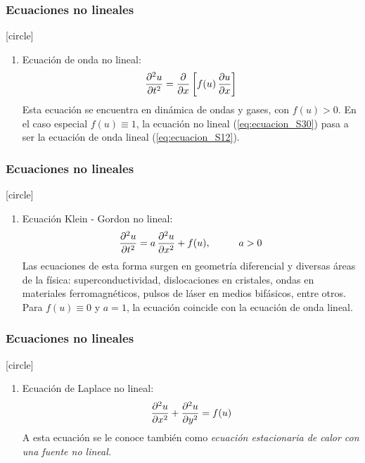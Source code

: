 \documentclass[12pt]{beamer}
\begin{document}
\begin{frame}
\frametitle{Ecuaciones no lineales}
[circle]
\begin{enumerate}[<+->]
\conti
\item Ecuación de onda no lineal:
\pause
\begin{align}
\pdv[2]{u}{t} = \pdv{x} \left[ f(u) \, \pdv{u}{x} \right]
\label{eq:ecuacion_S30}
\end{align}
Esta ecuación se encuentra en dinámica de ondas y gases, con $f(u) > 0$. En el caso especial $f(u) \equiv 1$, la ecuación no lineal (\ref{eq:ecuacion_S30}) pasa a ser la ecuación de onda lineal (\ref{eq:ecuacion_S12}).
\seti
\end{enumerate}
\end{frame}
\begin{frame}
\frametitle{Ecuaciones no lineales}
[circle]
\begin{enumerate}[<+->]
\conti
\item Ecuación Klein - Gordon no lineal:
\pause
\begin{align}
\pdv[2]{u}{t} = a \, \pdv[2]{u}{x} + f(u),\hspace{1cm} a > 0
\label{eq:ecuacion_S31}
\end{align}
Las ecuaciones de esta forma surgen en geometría diferencial y diversas áreas de la física: superconductividad, dislocaciones en cristales, ondas en materiales ferromagnéticos, pulsos de láser en medios bifásicos, entre otros.
\\
\bigskip
\pause
Para $f (u) \equiv 0$ y $a = 1$, la ecuación coincide con la ecuación de onda lineal.
\seti
\end{enumerate}
\end{frame}
\begin{frame}
\frametitle{Ecuaciones no lineales}
[circle]
\begin{enumerate}[<+->]
\conti
\item Ecuación de Laplace no lineal:
\pause
\begin{align}
\pdv[2]{u}{x} + \pdv[2]{u}{y} = f(u)
\label{eq:ecuacion_S32}
\end{align}
A esta ecuación se le conoce también como \emph{ecuación estacionaria de calor con una fuente no lineal.}
\seti
\end{enumerate}
\end{frame}
\end{document}
